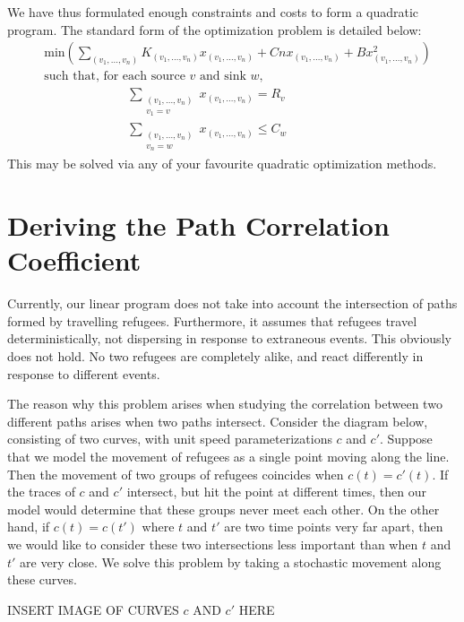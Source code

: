 \documentclass{article}
\begin{document}
We have thus formulated enough constraints and costs to form a quadratic program.  The standard form of the optimization problem is detailed below:
%
\begin{align*}
    &\text{min} \left( \sum_{(v_1, \dots, v_n)} K_{(v_1, \dots, v_n)} x_{(v_1, \dots, v_n)} + Cn x_{(v_1, \dots, v_n)} + B x_{(v_1, \dots, v_n)}^2 \right)\\
    &\text{such that, for each source $v$ and sink $w$,}\\
    &\ \ \ \ \ \ \ \ \ \ \ \ \ \ \ \ \ \ \ \ \ \ \ \ \ \ \ \ \ \ \sum_{\substack{(v_1, \dots, v_n) \\ v_1 = v}} x_{(v_1, \dots, v_n)} = R_v\\
    &\ \ \ \ \ \ \ \ \ \ \ \ \ \ \ \ \ \ \ \ \ \ \ \ \ \ \ \ \ \ \sum_{\substack{(v_1, \dots, v_n) \\ v_n = w}} x_{(v_1, \dots, v_n)} \leq C_w
\end{align*}
%
This may be solved via any of your favourite quadratic optimization methods.

\section{Deriving the Path Correlation Coefficient}

Currently, our linear program does not take into account the intersection of paths formed by travelling refugees. Furthermore, it assumes that refugees travel deterministically, not dispersing in response to extraneous events. This obviously does not hold. No two refugees are completely alike, and react differently in response to different events.

The reason why this problem arises when studying the correlation between two different paths arises when two paths intersect. Consider the diagram below, consisting of two curves, with unit speed parameterizations $c$ and $c'$. Suppose that we model the movement of refugees as a single point moving along the line. Then the movement of two groups of refugees coincides when $c(t) = c'(t)$. If the traces of $c$ and $c'$ intersect, but hit the point at different times, then our model would determine that these groups never meet each other. On the other hand, if $c(t) = c(t')$ where $t$ and $t'$ are two time points very far apart, then we would like to consider these two intersections less important than when $t$ and $t'$ are very close. We solve this problem by taking a stochastic movement along these curves.

INSERT IMAGE OF CURVES $c$ AND $c'$ HERE
\end{document}
